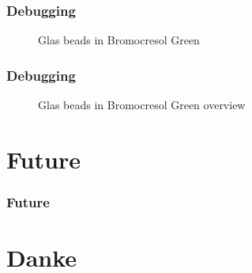\begin{frame}
	\frametitle{Debugging}
	\vspace{1cm} %
	\begin{figure}
	  \centering
	  \begin{minipage}[t]{0.3\textwidth}
	  \end{minipage}
	  \begin{minipage}[t]{0.3\textwidth}
	  \end{minipage}
	  \begin{minipage}[t]{0.3\textwidth}
	  \end{minipage}
	  
	  \caption{Glas beads in Bromocresol Green}
	\end{figure}
 
\end{frame}


\begin{frame}
	\frametitle{Debugging}
	\begin{figure}
	  \centering
	  \caption{Glas beads in Bromocresol Green overview}
	\end{figure}
 
\end{frame}

\section{Future}
\begin{frame}
	\frametitle{Future}
	\vspace{1cm} %
	\begin{figure}
	  \centering
	\end{figure}

\end{frame}

\section{Danke}



